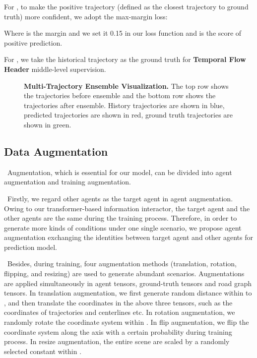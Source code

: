 \documentclass[10pt,twocolumn,letterpaper]{article}
\begin{document}
For  , to make the positive trajectory (defined as the closest trajectory to ground truth) more confident, we adopt the max-margin loss:
\begin{center}
    
\end{center}
Where  is the margin and we set it 0.15 in our loss function and  is the score of positive prediction.

For , we take the historical trajectory  as the ground truth for \textbf{Temporal Flow Header} middle-level supervision.
\begin{center}
        
\end{center}


\begin{figure*}
	\centering
  \quad
	\caption{\textbf{Multi-Trajectory Ensemble Visualization.} The top row shows the trajectories before ensemble and the bottom row shows the trajectories after ensemble. History trajectories are shown in blue, predicted trajectories are shown in red, ground truth trajectories are shown in green.}
	\label{ensemble}
\end{figure*}


\subsection {Data Augmentation}
	\ Augmentation, which is essential for our model, can be divided into agent augmentation and training augmentation.
	
	\ Firstly, we regard other agents as the target agent in agent augmentation. Owing to our transformer-based information interactor, the target agent and the other agents are the same during the training process. Therefore, in order to generate more kinds of conditions under one single scenario, we propose agent augmentation exchanging the identities between target agent and other agents for prediction model.
	
	\ Besides, during training, four augmentation methods (translation, rotation, flipping, and resizing) are used to generate abundant scenarios. Augmentations are applied simultaneously in agent tensors, ground-truth tensors and road graph tensors. In translation augmentation, we first generate random distance within  to , and then translate the coordinates in the above three tensors, such as the coordinates of trajectories and centerlines etc. In rotation augmentation, we randomly rotate the coordinate system within . In flip augmentation, we flip the coordinate system along the  axis with a certain probability during training process. In resize augmentation, the entire scene are scaled by a randomly selected constant within . 
\end{document}
